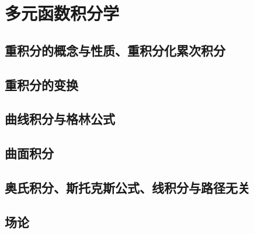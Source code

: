 \chapter{多元函数积分学}
\section{重积分的概念与性质、重积分化累次积分}

\section{重积分的变换}

\section{曲线积分与格林公式}

\section{曲面积分}

\section{奥氏积分、斯托克斯公式、线积分与路径无关}

\section{场论}